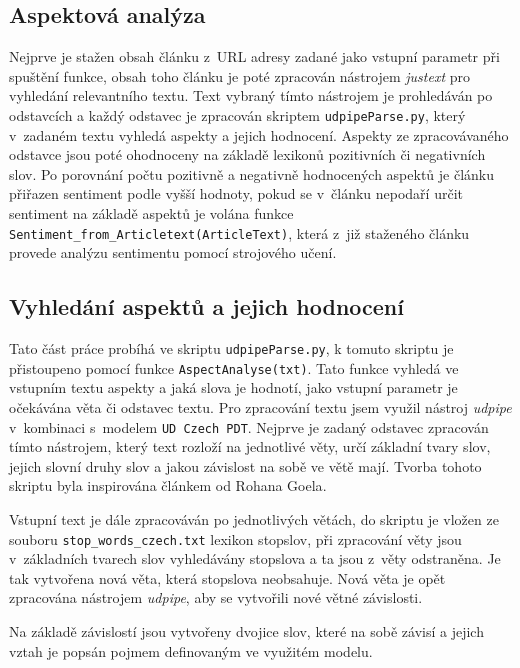 \subsection*{Aspektová analýza}

Nejprve je stažen obsah článku z~URL adresy zadané jako vstupní parametr při spuštění funkce, obsah toho článku je poté zpracován nástrojem \textit{justext} pro vyhledání relevantního textu. Text vybraný tímto nástrojem je prohledáván po odstavcích a každý odstavec je zpracován skriptem \verb|udpipeParse.py|, který v~zadaném textu vyhledá aspekty a jejich hodnocení. Aspekty ze zpracovávaného odstavce jsou poté ohodnoceny na základě lexikonů pozitivních či negativních slov. Po porovnání počtu pozitivně a negativně hodnocených aspektů je článku přiřazen sentiment podle vyšší hodnoty, pokud se v~článku nepodaří určit sentiment na základě aspektů je volána funkce \verb|Sentiment_from_Articletext(ArticleText)|, která z~již staženého článku provede analýzu sentimentu pomocí strojového učení. 

\subsection*{Vyhledání aspektů a jejich hodnocení}

Tato část práce probíhá ve skriptu \verb|udpipeParse.py|, k tomuto skriptu je přistoupeno pomocí funkce {\verb|AspectAnalyse(txt)|}. Tato funkce vyhledá ve vstupním textu aspekty a jaká slova je hodnotí, jako vstupní parametr je očekávána věta či odstavec textu. Pro zpracování textu jsem využil nástroj \textit{udpipe} v~kombinaci s~modelem \verb|UD Czech PDT|. Nejprve je zadaný odstavec zpracován tímto nástrojem, který text rozloží na jednotlivé věty, určí základní tvary slov, jejich slovní druhy slov a jakou závislost na sobě ve větě mají\cite{chockalingam2018}. Tvorba tohoto skriptu byla inspirována článkem od Rohana Goela\cite{goel_2020}. 

Vstupní text je dále zpracováván po jednotlivých větách, do skriptu je vložen ze souboru \verb|stop_words_czech.txt| lexikon stopslov, při zpracování věty jsou v~základních tvarech slov vyhledávány stopslova a ta jsou z~věty odstraněna. Je tak vytvořena nová věta, která stopslova neobsahuje. Nová věta je opět zpracována nástrojem \textit{udpipe}, aby se vytvořili nové větné závislosti.

Na základě závislostí jsou vytvořeny dvojice slov, které na sobě závisí a jejich vztah je popsán pojmem definovaným ve využitém modelu. 

